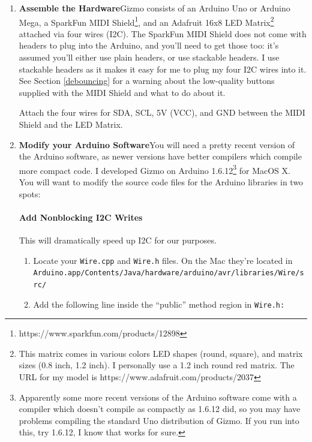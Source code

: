 \documentclass{article}
\begin{document}
\begin{enumerate}

\item {\bf Assemble the Hardware}\quad Gizmo consists of an Arduino Uno or Arduino Mega, a SparkFun MIDI Shield\footnote{https:/\!/www.sparkfun.com/products/12898}, and an Adafruit 16x8 LED Matrix\footnote{This matrix comes in various colors LED shapes (round, square), and matrix sizes (0.8 inch, 1.2 inch).  I personally use a 1.2 inch round red matrix.  The URL for my model is https:/\!/www.adafruit.com/products/2037} attached via four wires (I2C).  The SparkFun MIDI Shield does not come with headers to plug into the Arduino, and you'll need to get those too: it's assumed you'll either use plain headers, or use stackable headers.  I use stackable headers as it makes it easy for me to plug my four I2C wires into it.  See Section \ref{debouncing} for a warning about the low-quality buttons supplied with the MIDI Shield and what to do about it.

Attach the four wires for SDA, SCL, 5V (VCC), and GND between the MIDI Shield and the LED Matrix.  

\item {\bf Modify your Arduino Software}\quad You will need a pretty recent version of the Arduino software, as newer versions have better compilers which compile more compact code.  I developed Gizmo on Arduino 1.6.12\footnote{Apparently some more recent versions of the Arduino software come with a compiler which doesn't compile as compactly as 1.6.12 did, so you may have problems compiling the standard Uno distribution of Gizmo.  If you run into this, try 1.6.12, I know that works for sure.} for MacOS X.  You will want to modify the source code files for the Arduino libraries in two spots:

\paragraph{Add Nonblocking I2C Writes}  This will dramatically speed up I2C for our purposes.
\begin{enumerate}
\item Locate your \texttt{Wire.cpp} and \texttt{Wire.h} files.  On the Mac they're located in\\\texttt{Arduino.app/Contents/Java/hardware/arduino/avr/libraries/Wire/src/}

\item Add the following line inside the ``public'' method region in \texttt{Wire.h:}


\end{enumerate}
\end{enumerate}
\end{document}
